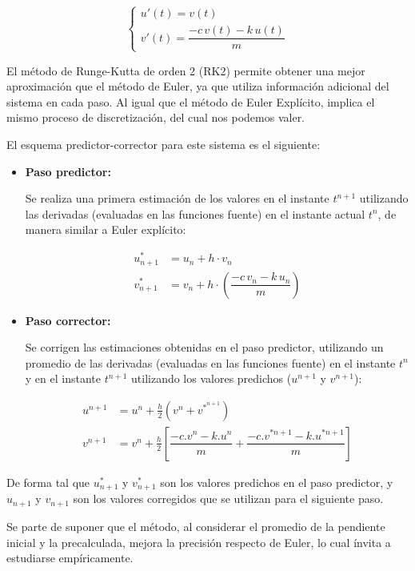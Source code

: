 \documentclass[titlepage,a4paper]{article}
\begin{document}
\[
\begin{cases}
u'(t) = v(t) \\
v'(t) = \dfrac{-c\,v(t) - k\,u(t)}{m}
\end{cases}
\]

El método de Runge-Kutta de orden 2 (RK2) permite obtener una mejor aproximación que el método de Euler, ya que utiliza información adicional del sistema en cada paso. Al igual que el método de Euler Explícito, implica el mismo proceso de discretización, del cual nos podemos valer.

El esquema predictor-corrector para este sistema es el siguiente:

\begin{itemize}
    \item \textbf{Paso predictor:}

    Se realiza una primera estimación de los valores en el instante $t^{n+1}$ utilizando las derivadas (evaluadas en las funciones fuente) en el instante actual $t^n$, de manera similar a Euler explícito:
     
    \begin{align*}
        u^*_{n+1} &= u_n + h \cdot v_n \\
        v^*_{n+1} &= v_n + h \cdot \left(\dfrac{-c\,v_n - k\,u_n}{m}\right)
    \end{align*}

    
    \item \textbf{Paso corrector:}

    Se corrigen las estimaciones obtenidas en el paso predictor, utilizando un promedio de las derivadas (evaluadas en las funciones fuente) en el instante $t^n$ y en el instante $t^{n+1}$ utilizando los valores predichos ($u^{n+1}$ y $v^{n+1}$):
    
    \begin{align*}
        u^{n+1} &= u^n + \frac{h}{2} (v^n + v^*^{n+1}) \\
        v^{n+1} &= v^n + \frac{h}{2} \left[ \dfrac{-c.v^n - k.u^n}{m} + \dfrac{-c.v^{*n+1} - k.u^{*n+1}}{m} \right]
    \end{align*}
\end{itemize}

De forma tal que $u^*_{n+1}$ y $v^*_{n+1}$ son los valores predichos en el paso predictor, y $u_{n+1}$ y $v_{n+1}$ son los valores corregidos que se utilizan para el siguiente paso.

Se parte de suponer que el método, al considerar el promedio de la pendiente inicial y la precalculada, mejora la precisión respecto de Euler, lo cual ínvita a estudiarse empíricamente.
\end{document}
